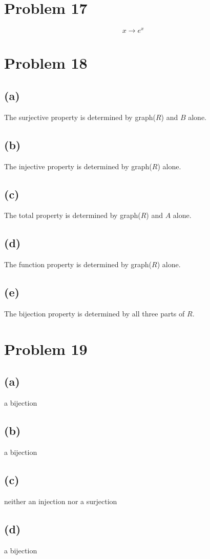 \documentclass{article}
\begin{document}
\section{Problem 17}
\[
	x \rightarrow e^x
\]

\pagebreak

\section{Problem 18}
\subsection{(a)}
The surjective property is determined by graph($R$) and $B$ alone.
\subsection{(b)}
The injective property is determined by graph($R$) alone.
\subsection{(c)}
The total property is determined by graph($R$) and $A$ alone.
\subsection{(d)}
The function property is determined by graph($R$) alone.
\subsection{(e)}
The bijection property is determined by all three parts of $R$.

\pagebreak

\section{Problem 19}
\subsection{(a)}
a bijection
\subsection{(b)}
a bijection
\subsection{(c)}
neither an injection nor a surjection
\subsection{(d)}
a bijection
\end{document}
